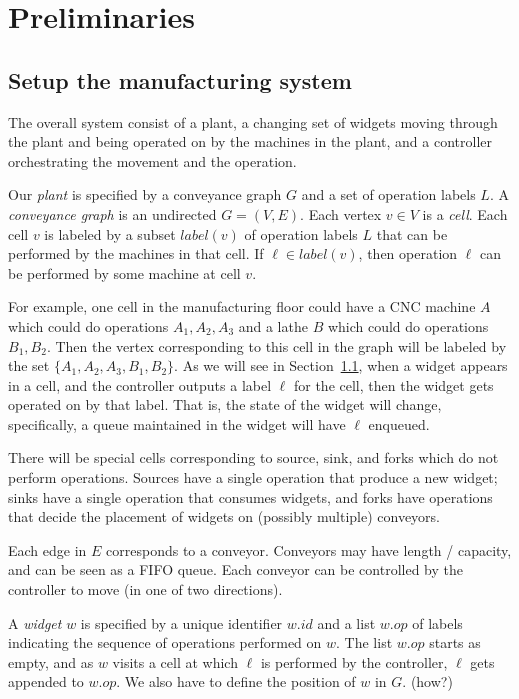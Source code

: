 \documentclass[9pt,conference, compsocconf]{IEEEtran}
\begin{document}
\section{Preliminaries}
\label{sec:prelim}

\subsection{Setup the manufacturing system}
The overall system consist of a plant, a changing set of widgets moving through the plant and being operated on by the machines in the plant, and a controller orchestrating the movement and the operation. 

Our {\em plant} is specified by a conveyance graph $G$ and a set of operation labels $L$. 
A {\em conveyance graph\/} is an undirected $G =(V,E)$. Each vertex $v \in V$ is a {\em cell\/}. 
%
Each cell $v$ is labeled by a subset $\mathit{label}(v)$ of operation labels $L$ that can be performed by the machines in that cell. If $\ell \in \mathit{label}(v)$, then operation $\ell$ can be performed by some machine at cell $v$. 

For example, one cell in the manufacturing floor could have a CNC machine $A$ which could do operations $A_1, A_2,A_3$ and a lathe $B$ which could do operations $B_1, B_2$. Then the vertex corresponding to this cell in the graph will be labeled by the set $\{A_1, A_2, A_3, B_1, B_2\}$. As we will see in Section~\ref{}, when a widget  appears in a cell, and the controller outputs a label $\ell$ for the cell, then the widget gets operated on by that label. That is, the state of the widget will change, specifically, a queue maintained in the widget will have $\ell$ enqueued. 

There will be special cells corresponding to source, sink, and forks which do not perform operations. Sources have a single operation that produce a  new widget; sinks have a single operation that consumes widgets, and forks have operations that decide the placement of widgets on (possibly multiple) conveyors.  

%
%
Each edge in $E$ corresponds to a conveyor.
Conveyors may have length / capacity, and can be seen as a FIFO queue. Each conveyor can be controlled by the controller to move (in one of two directions).

A {\em widget} $w$ is specified by a unique identifier $\mathit{w.id}$ and a list $\mathit{w.op}$ of labels indicating the sequence of operations performed on $w$. The list $\mathit{w.op}$ starts as empty, and as $w$ visits a cell at which $\ell$ is performed by the controller, $\ell$ gets appended to $\mathit{w.op}$.
%
We also have to define the position of $w$ in $G$. (how?)
\end{document}
